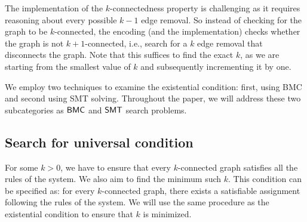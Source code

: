 %
The implementation of the $k$-connectedness property is challenging as it requires reasoning about every possible $k − 1$ edge removal.
%
So instead of checking for the graph to be $k$-connected, the encoding (and the implementation) checks whether the graph is not $k+1$-connected, i.e., search for a $k$ edge removal that disconnects the graph.
%
Note that this suffices to find the exact $k$, as we are starting from the smallest value of $k$ and subsequently incrementing it by one.

We employ two techniques to examine the existential condition: first, using BMC and second using SMT solving.
%
Throughout the paper, we will address these two subcategories as $\mathsf{BMC}$ and $\mathsf{SMT}$ search problems.
%
%
%


\subsection{Search for universal condition}
%
For some $k>0$,
we have to ensure that every $k$-connected graph satisfies all
the rules of the system.
%
We also aim to find the minimum such $k$. 
%
This condition can be specified as: for every $k$-connected graph, there exists a satisfiable assignment following the rules of the system. 
%
%
We will use the same procedure as the existential condition to ensure that $k$ is minimized.
%

